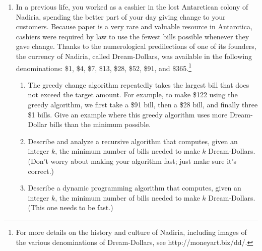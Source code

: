 \begin{enumerate}[label=\arabic*.,ref=\thechapter.\arabic*,leftmargin=*,align=left,widest*=99,itemsep=1.5ex plus 0.5ex]
\item In a previous life, you worked as a cashier in the lost Antarctican colony of Nadiria, spending the better part of your day giving change to your customers.
Because paper is a very rare and valuable resource in Antarctica, cashiers were required by law to use the fewest bills possible whenever they gave change.
Thanks to the numerological predilections of one of its founders, the currency of Nadiria, called Dream-Dollars, was available in the following denominations: \$1, \$4, \$7, \$13, \$28, \$52, \$91, and \$365.\footnote{For more details on the history and culture of Nadiria, including images of the various denominations of Dream-Dollars, see http://moneyart.biz/dd/.}
\begin{enumerate}
\item {} The greedy change algorithm repeatedly takes the largest bill that does not exceed the target amount.
For example, to make \$122 using the greedy algorithm, we first take a \$91 bill, then a \$28 bill, and finally three \$1 bills.
Give an example where this greedy algorithm uses more Dream-Dollar bills than the minimum possible.
\item Describe and analyze a recursive algorithm that computes, given an integer $k$, the minimum number of bills needed to make $k$ Dream-Dollars.
(Don’t worry about making your algorithm fast; just make sure it’s correct.)
\item Describe a dynamic programming algorithm that computes, given an integer $k$, the minimum number of bills needed to make $k$ Dream-Dollars.
(This one needs to be fast.)
\end{enumerate}


\end{enumerate}
